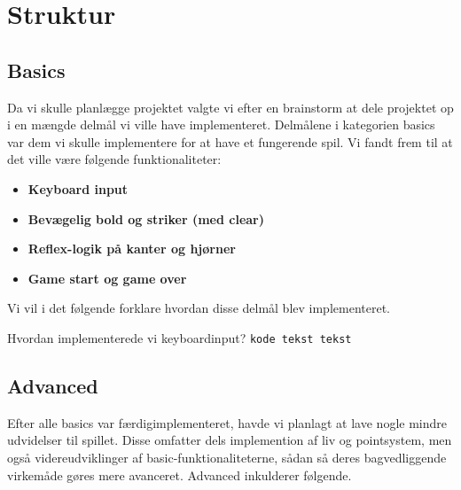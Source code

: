\chapter{Struktur}

\section{Basics}
Da vi skulle planlægge projektet valgte vi efter en brainstorm at dele projektet op i en mængde delmål vi ville have implementeret. Delmålene i kategorien basics var dem vi skulle implementere for at have et fungerende spil. Vi fandt frem til at det ville være følgende funktionaliteter:
\begin{itemize}
\item \textbf{Keyboard input}
\item \textbf{Bevægelig bold og striker (med clear)}
\item \textbf{Reflex-logik på kanter og hjørner}
\item \textbf{Game start og game over}
\end{itemize}
Vi vil i det følgende forklare hvordan disse delmål blev implementeret. 

Hvordan implementerede vi keyboardinput?
\texttt{kode tekst tekst}

\section{Advanced}
Efter alle basics var færdigimplementeret, havde vi planlagt at lave nogle mindre udvidelser til spillet. Disse omfatter dels implemention af liv og pointsystem, men også videreudviklinger af basic-funktionaliteterne, sådan så deres bagvedliggende virkemåde gøres mere avanceret. Advanced inkulderer følgende.

